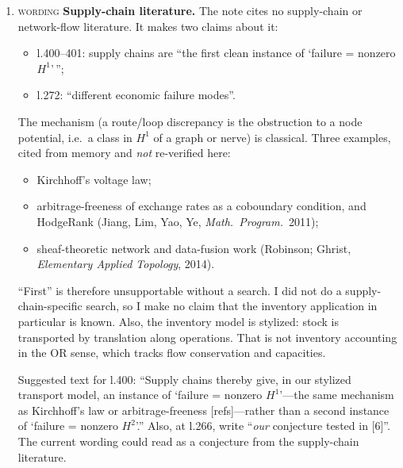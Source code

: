 \documentclass[11pt]{article}
\newcommand{\iss}[1]{\textsc{#1}}
\begin{document}
\begin{enumerate}[label=\textbf{4.\arabic*},leftmargin=*]
\item \iss{wording} \textbf{Supply-chain literature.} The note cites no supply-chain or
network-flow literature. It makes two claims about it:
\begin{itemize}[leftmargin=1.2em]
\item l.400--401: supply chains are ``the first clean instance of `failure = nonzero $H^1$'\,'';
\item l.272: ``different economic failure modes''.
\end{itemize}
The mechanism (a route/loop discrepancy is the obstruction to a node potential, i.e.\ a class in
$H^1$ of a graph or nerve) is classical. Three examples, cited from memory and \emph{not}
re-verified here:
\begin{itemize}[leftmargin=1.2em]
\item Kirchhoff's voltage law;
\item arbitrage-freeness of exchange rates as a coboundary condition, and HodgeRank (Jiang, Lim,
Yao, Ye, \emph{Math.\ Program.}\ 2011);
\item sheaf-theoretic network and data-fusion work (Robinson; Ghrist, \emph{Elementary Applied
Topology}, 2014).
\end{itemize}
``First'' is therefore unsupportable without a search. I did not do a supply-chain-specific
search, so I make no claim that the inventory application in particular is known. Also, the
inventory model is stylized: stock is transported by translation along operations. That is not
inventory accounting in the OR sense, which tracks flow conservation and capacities.

Suggested text for l.400: ``Supply chains thereby give, in our stylized transport model, an
instance of `failure = nonzero $H^1$'---the same mechanism as Kirchhoff's law or arbitrage-freeness
[refs]---rather than a second instance of `failure = nonzero $H^2$'.'' Also, at l.266, write
``\emph{our} conjecture tested in [6]''. The current wording could read as a conjecture from the
supply-chain literature.
\end{enumerate}
\end{document}
